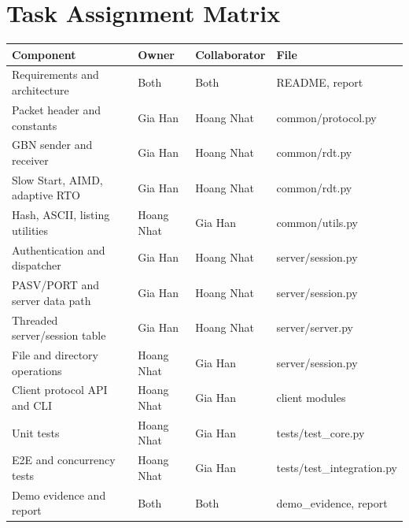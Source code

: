 \section{Task Assignment Matrix}

\begin{longtable}{p{}p{}p{}p{}}
\toprule
Component & Owner & Collaborator & File\\
\midrule
Requirements and architecture & Both & Both & README, report\\
Packet header and constants & Gia Han & Hoang Nhat & common/protocol.py\\
GBN sender and receiver & Gia Han & Hoang Nhat & common/rdt.py\\
Slow Start, AIMD, adaptive RTO & Gia Han & Hoang Nhat & common/rdt.py\\
Hash, ASCII, listing utilities & Hoang Nhat & Gia Han & common/utils.py\\
Authentication and dispatcher & Gia Han & Hoang Nhat & server/session.py\\
PASV/PORT and server data path & Gia Han & Hoang Nhat & server/session.py\\
Threaded server/session table & Gia Han & Hoang Nhat & server/server.py\\
File and directory operations & Hoang Nhat & Gia Han & server/session.py\\
Client protocol API and CLI & Hoang Nhat & Gia Han & client modules\\
Unit tests & Hoang Nhat & Gia Han & tests/test\_core.py\\
E2E and concurrency tests & Hoang Nhat & Gia Han & tests/test\_integration.py\\
Demo evidence and report & Both & Both & demo\_evidence, report\\
\bottomrule
\end{longtable}